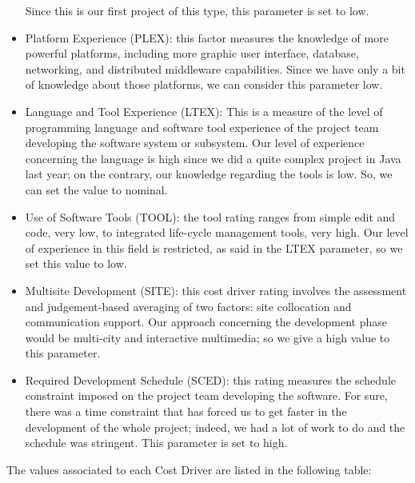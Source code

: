 \begin{itemize}
        \newline 
        Since this is our first project of this type, this parameter is set to low. 
    \item Platform Experience (PLEX): this factor measures the knowledge of more powerful platforms, including more graphic user interface, database, networking, and distributed middleware capabilities.
        \newline 
        Since we have only a bit of knowledge about those platforms, we can consider this parameter low.
    \item Language and Tool Experience (LTEX): This is a measure of the level of programming language and software tool experience of the project team developing the software system or subsystem.
        \newline 
        Our level of experience concerning the language is high since we did a quite complex project in Java last year; on the contrary, our knowledge regarding the tools is low. So, we can set the value to nominal. 
    \item Use of Software Tools (TOOL): the tool rating ranges from simple edit and code, very low, to integrated life-cycle management tools, very high.
        \newline
        Our level of experience in this field is restricted, as said in the LTEX parameter, so we set this value to low.
    \item Multisite Development (SITE): this cost driver rating involves the assessment and judgement-based averaging of two factors: site collocation and communication support.
        \newline 
        Our approach concerning the development phase would be multi-city and interactive multimedia; so we give a high value to this parameter.
    \item Required Development Schedule (SCED): this rating measures the schedule constraint imposed on the project team developing the software.
        \newline 
        For sure, there was a time constraint that has forced us to get faster in the development of the whole project; indeed, we had a lot of work to do and the schedule was stringent. This parameter is set to high. 
\end{itemize}
\newpage
The values associated to each Cost Driver are listed in the following table:
\newline
